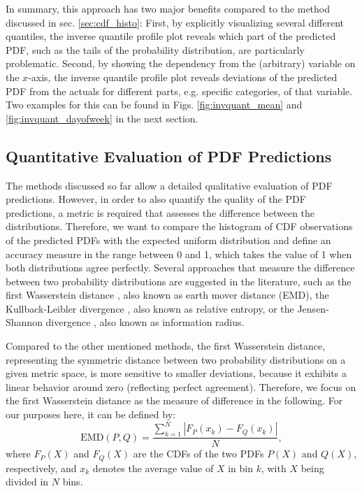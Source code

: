 \documentclass[BCOR=1mm, DIV=calc,10pt,
twoside=true,
twocolumn,
headings=normal]{scrartcl}
\begin{document}
In summary, this approach has two major benefits compared to the method discussed in sec. \ref{sec:cdf_histo}: First, by explicitly visualizing several different quantiles, the inverse quantile profile plot reveals which part of the predicted PDF, such as the tails of the probability distribution, are particularly problematic. Second, by showing the dependency from the (arbitrary) variable on the $x$-axis, the inverse quantile profile plot reveals deviations of the predicted PDF from the actuals for different parts, e.g. specific categories, of that variable. Two examples for this can be found in Figs. \ref{fig:invquant_mean} and \ref{fig:invquant_dayofweek} in the next section.

\subsection{Quantitative Evaluation of PDF Predictions}
\label{sec:cdf_acc}

The methods discussed so far allow a detailed qualitative evaluation of PDF predictions. However, in order to also quantify the quality of the PDF predictions, a metric is required that assesses the difference between the distributions. Therefore, we want to compare the histogram of CDF observations of the predicted PDFs with the expected uniform distribution and define an accuracy measure in the range between 0 and 1, which takes the value of 1 when both distributions agree perfectly. Several approaches that measure the difference between two probability distributions are suggested in the literature, such as the first Wasserstein distance \cite{olkin1982}, also known as earth mover distance (EMD), the Kullback-Leibler divergence \cite{kullback1951}, also known as relative entropy, or the Jensen-Shannon divergence \cite{dagan1997}, also known as information radius.

Compared to the other mentioned methods, the first Wasserstein distance, representing the symmetric distance between two probability distributions on a given metric space, is more sensitive to smaller deviations, because it exhibits a linear behavior around zero (reflecting perfect agreement). Therefore, we focus on the first Wasserstein distance as the measure of difference in the following. For our purposes here, it can be defined by:
\begin{equation}
\text{EMD}(P, Q) = \frac{\sum_{k=1}^N |F_P(x_k) - F_Q(x_k)|}{N},
\end{equation}
where $F_P(X)$ and $F_Q(X)$ are the CDFs of the two PDFs $P(X)$ and $Q(X)$, respectively, and $x_k$ denotes the average value of $X$ in bin $k$, with $X$ being divided in $N$ bins.
\end{document}
